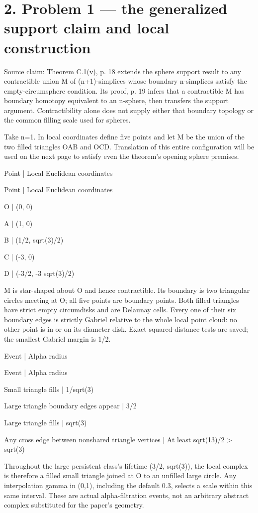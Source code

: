 \documentclass[10pt]{article}
\begin{document}
\section*{2. Problem 1 — the generalized support claim and local construction}
Source claim: Theorem C.1(v), p. 18 extends the sphere support result to any contractible union M of (n+1)-simplices whose boundary n-simplices satisfy the empty-circumsphere condition. Its proof, p. 19 infers that a contractible M has boundary homotopy equivalent to an n-sphere, then transfers the support argument. Contractibility alone does not supply either that boundary topology or the common filling scale used for spheres.\par
Take n=1. In local coordinates define five points and let M be the union of the two filled triangles OAB and OCD. Translation of this entire configuration will be used on the next page to satisfy even the theorem’s opening sphere premises.\par
Point | Local Euclidean coordinates\par
Point | Local Euclidean coordinates\par
O | (0, 0)\par
A | (1, 0)\par
B | (1/2, sqrt(3)/2)\par
C | (-3, 0)\par
D | (-3/2, -3 sqrt(3)/2)\par
M is star-shaped about O and hence contractible. Its boundary is two triangular circles meeting at O; all five points are boundary points. Both filled triangles have strict empty circumdisks and are Delaunay cells. Every one of their six boundary edges is strictly Gabriel relative to the whole local point cloud: no other point is in or on its diameter disk. Exact squared-distance tests are saved; the smallest Gabriel margin is 1/2.\par
Event | Alpha radius\par
Event | Alpha radius\par
Small triangle fills | 1/sqrt(3)\par
Large triangle boundary edges appear | 3/2\par
Large triangle fills | sqrt(3)\par
Any cross edge between nonshared triangle vertices | At least sqrt(13)/2 > sqrt(3)\par
Throughout the large persistent class’s lifetime (3/2, sqrt(3)), the local complex is therefore a filled small triangle joined at O to an unfilled large circle. Any interpolation gamma in (0,1), including the default 0.3, selects a scale within this same interval. These are actual alpha-filtration events, not an arbitrary abstract complex substituted for the paper’s geometry.\par
\end{document}
